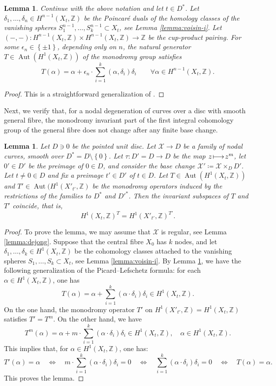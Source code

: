 \documentclass[a4paper,11pt,reqno]{amsart}
\makeatletter
\numberwithin{equation}{section}
\theoremstyle{plain}
\newtheorem{lemma}[theorem]{Lemma}
\theoremstyle{definition}
\newcommand{\Z}{\mathbb Z}
\newcommand{\Aut}{\operatorname{Aut}}
\newcommand{\ca}[1]{{\mathcal{#1}}}
\renewcommand{\mapsto}{\xymatrix@1@=15pt{\ar@{|->}[r]&}}
\newcommand{\set}[1]{\left\{ #1 \right\}}
\makeatother
\begin{document}
\begin{lemma} \label{lemma:voisin:PL}
Continue with the above notation and let $t \in D^\ast$. 
Let $\delta_1, \dotsc, \delta_n \in H^{n-1}(X_t,\Z)$ be the Poincar\'e duals of the homology classes of the vanishing spheres $S_1^{n-1}, \dotsc, S_k^{n-1} \subset X_t$, see Lemma \ref{lemma:voisin-i}. Let $(-,-) \colon H^{n-1}(X_t,\Z) \times H^{n-1}(X_t,\Z) \to \Z$ be the cup-product pairing. For some $\epsilon_n \in \set{\pm 1}$, depending only on $n$, the natural generator $T \in \Aut(H^1(X_t,\Z))$ of the monodromy group satisfies
    \[
    T(\alpha)  = \alpha + \epsilon_n \cdot \sum_{i = 1}^k \left(\alpha, \delta_i\right) \delta_i \quad \quad  \forall \alpha \in H^{n-1}(X_t,\Z). 
    \]
\end{lemma}
\begin{proof}
        This is a straightforward generalization of \cite[Theorem 3.16]{voisin-II}.
\end{proof}
Next, we verify that, for a nodal degeneration of curves over a disc with smooth general fibre, the monodromy invariant part of the first integral cohomology group of the general fibre does not change after any finite base change. 

\begin{lemma}
\label{lemma:family:3} 
Let $D \ni 0$ be the pointed unit disc. 
Let
$
\ca X\to D
$
be a family of nodal curves, smooth over $D^\ast = D \setminus \set{0}$.  
Let $\tau\colon D' = D\to D$ be the map $z \mapsto z^m$, let $0 ' \in D'$ be the preimage of $0 \in D$, 
and consider the base change $\ca X'\coloneqq \ca X \times_{D} D'$. 
Let $t \neq 0 \in D$ and fix a preimage $t'\in D'$ of $t\in D$. Let $T \in \Aut(H^1(X_t,\Z))$ and $T' \in \Aut(H^1(X'_{t'},\Z)$ be the monodromy operators induced by the restrictions of the families to $D^\ast$ and ${D'}^\ast$. Then the invariant subspaces of $T$ and $T'$ coincide, that is,
$$
H^1(X_t,\Z)^{T}=H^1(X'_{t'},\Z)^{T'} .
$$
\end{lemma}
\begin{proof}
To prove the lemma, we may assume that $\ca X$ is regular, see Lemma \ref{lemma:dejong}. Suppose that the central fibre $X_0$ has $k$ nodes, and let $\delta_1, \dotsc, \delta_k \in H^1(X_t,\Z)$ be the cohomology classes attached to the vanishing spheres $S_1, \dotsc, S_k \subset X_t$, see Lemma \ref{lemma:voisin-i}.  
By Lemma \ref{lemma:voisin:PL}, we have the following generalization of the Picard--Lefschetz formula: for each $\alpha \in H^1(X_t,\Z)$, one has 
\[
T(\alpha) = \alpha + \sum_{i = 1}^k (\alpha \cdot \delta_i)\delta_i \in H^1(X_t,\Z). 
\]
On the one hand, the monodromy operator $T'$ on $H^1(X'_{t'},\Z)=H^1(X_{t},\Z)$ satisfies $T'=T^{m}$. On the other hand, we have 
\[
T^m(\alpha) = \alpha + m \cdot \sum_{i = 1}^k (\alpha \cdot \delta_i)\delta_i \in H^1(X_t,\Z), \quad \alpha \in H^1(X_t,\Z). 
\]
This implies that, for $\alpha \in H^1(X_t,\Z)$, one has:
\[
T'(\alpha) = \alpha \quad \iff \quad m \cdot \sum_{i = 1}^k (\alpha \cdot \delta_i)\delta_i = 0 \quad \iff \quad \sum_{i = 1}^k (\alpha \cdot \delta_i)\delta_i = 0 \quad \iff \quad  T(\alpha) = \alpha. 
\]
This proves the lemma.  
\end{proof}
 
\end{document}
